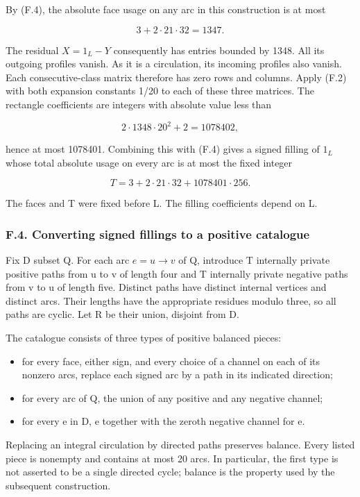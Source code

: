 \documentclass[english,11pt,a4paper]{article}
\providecommand{\tightlist}{\setlength{\itemsep}{0pt}\setlength{\parskip}{0pt}}
\newcounter{none}
\begin{document}
By (F.4), the absolute face usage on any arc in this construction is at most

\[3+2\cdot21\cdot32=1347.\]

The residual \(X=1_{L}-Y\) consequently has entries bounded by 1348. All its outgoing profiles vanish. As it is a circulation, its incoming profiles also vanish. Each consecutive-class matrix therefore has zero rows and columns. Apply (F.2) with both expansion constants 1/20 to each of these three matrices. The rectangle coefficients are integers with absolute value less than

\[2\cdot1348\cdot20^2+2=1078402,\]

hence at most 1078401. Combining this with (F.4) gives a signed filling of \(1_{L}\) whose total absolute usage on every arc is at most the fixed integer

\[T=3+2\cdot21\cdot32+1078401\cdot256.\tag{F.5}\]

The faces and T were fixed before L. The filling coefficients depend on L.

\subsubsection{F.4. Converting signed fillings to a positive catalogue}\label{f.4.-converting-signed-fillings-to-a-positive-catalogue}

Fix D subset Q. For each arc \(e=u\to v\) of Q, introduce T internally private positive paths from u to v of length four and T internally private negative paths from v to u of length five. Distinct paths have distinct internal vertices and distinct arcs. Their lengths have the appropriate residues modulo three, so all paths are cyclic. Let R be their union, disjoint from D.

The catalogue consists of three types of positive balanced pieces:

\begin{itemize}
\tightlist
\item
  for every face, either sign, and every choice of a channel on each of its nonzero arcs, replace each signed arc by a path in its indicated direction;
\item
  for every arc of Q, the union of any positive and any negative channel;
\item
  for every e in D, e together with the zeroth negative channel for e.
\end{itemize}

Replacing an integral circulation by directed paths preserves balance. Every listed piece is nonempty and contains at most 20 arcs. In particular, the first type is not asserted to be a single directed cycle; balance is the property used by the subsequent construction.
\end{document}
